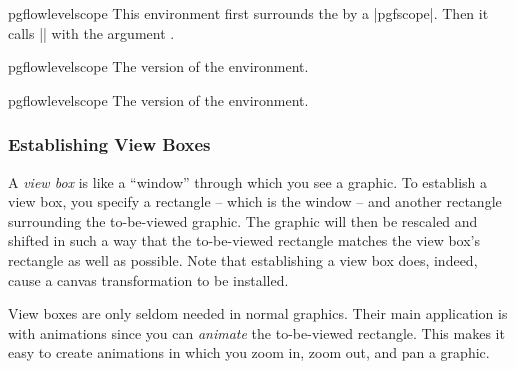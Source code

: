 \begin{environment}{{pgflowlevelscope}}
    This environment first surrounds the  by a
    |{pgfscope}|. Then it calls |\pgflowlevel| with the argument
    .
\begin{codeexample}[]
\end{codeexample}
\end{environment}

\begin{plainenvironment}{{pgflowlevelscope}}
    The  version of the environment.
\end{plainenvironment}

\begin{contextenvironment}{{pgflowlevelscope}}
    The  version of the environment.
\end{contextenvironment}


\subsubsection{Establishing View Boxes}
\label{section-base-view}

A \emph{view box} is like a ``window'' through which you see a graphic. To
establish a view box, you specify a rectangle -- which is the window -- and
another rectangle surrounding the to-be-viewed graphic. The graphic will then
be rescaled and shifted in such a way that the to-be-viewed rectangle matches
the view box's rectangle as well as possible. Note that establishing a view box
does, indeed, cause a canvas transformation to be installed.

View boxes are only seldom needed in normal graphics. Their main application is
with animations since you can \emph{animate} the to-be-viewed rectangle. This
makes it easy to create animations in which you zoom in, zoom out, and pan a
graphic.

